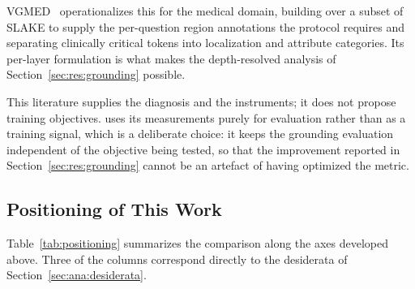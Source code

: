 VGMED~\cite{liu2026vgmed} operationalizes this for the medical domain, building over a subset of SLAKE to supply the per-question region annotations the protocol requires and separating clinically critical tokens into localization and attribute categories. Its per-layer formulation is what makes the depth-resolved analysis of Section~\ref{sec:res:grounding} possible.

This literature supplies the diagnosis and the instruments; it does not propose training objectives. \ourloss{} uses its measurements purely for evaluation rather than as a training signal, which is a deliberate choice: it keeps the grounding evaluation independent of the objective being tested, so that the improvement reported in Section~\ref{sec:res:grounding} cannot be an artefact of having optimized the metric.

\subsection{Positioning of This Work}
\label{sec:rel:positioning}

Table~\ref{tab:positioning} summarizes the comparison along the axes developed above. Three of the columns correspond directly to the desiderata of Section~\ref{sec:ana:desiderata}.

